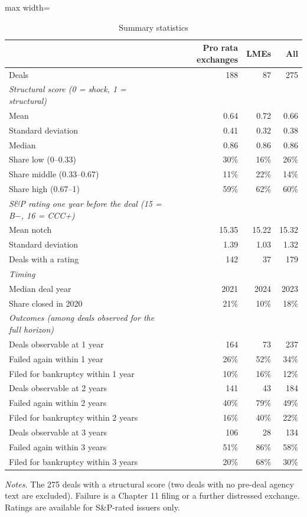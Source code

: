 \begin{table}[htbp]
\centering
\caption{Summary statistics}
\label{tab:sumstats}
\small
\begin{adjustbox}{max width=\textwidth}
\begin{tabular}{l r r r}
\toprule
 & Pro rata exchanges & LMEs & All \\
\midrule
Deals & 188 & 87 & 275 \\
\addlinespace \textit{Structural score (0 = shock, 1 = structural)} & & & \\
\quad Mean & 0.64 & 0.72 & 0.66 \\
\quad Standard deviation & 0.41 & 0.32 & 0.38 \\
\quad Median & 0.86 & 0.86 & 0.86 \\
\quad Share low (0--0.33) & 30\% & 16\% & 26\% \\
\quad Share middle (0.33--0.67) & 11\% & 22\% & 14\% \\
\quad Share high (0.67--1) & 59\% & 62\% & 60\% \\
\addlinespace \textit{S\&P rating one year before the deal (15 = B$-$, 16 = CCC+)} & & & \\
\quad Mean notch & 15.35 & 15.22 & 15.32 \\
\quad Standard deviation & 1.39 & 1.03 & 1.32 \\
\quad Deals with a rating & 142 & 37 & 179 \\
\addlinespace \textit{Timing} & & & \\
\quad Median deal year & 2021 & 2024 & 2023 \\
\quad Share closed in 2020 & 21\% & 10\% & 18\% \\
\addlinespace \textit{Outcomes (among deals observed for the full horizon)} & & & \\
\quad Deals observable at 1 year & 164 & 73 & 237 \\
\quad\quad Failed again within 1 year & 26\% & 52\% & 34\% \\
\quad\quad Filed for bankruptcy within 1 year & 10\% & 16\% & 12\% \\
\quad Deals observable at 2 years & 141 & 43 & 184 \\
\quad\quad Failed again within 2 years & 40\% & 79\% & 49\% \\
\quad\quad Filed for bankruptcy within 2 years & 16\% & 40\% & 22\% \\
\quad Deals observable at 3 years & 106 & 28 & 134 \\
\quad\quad Failed again within 3 years & 51\% & 86\% & 58\% \\
\quad\quad Filed for bankruptcy within 3 years & 20\% & 68\% & 30\% \\
\bottomrule
\end{tabular}
\end{adjustbox}
\begin{minipage}{0.9\textwidth}\vspace{4pt}\footnotesize
\textit{Notes.} The 275 deals with a structural score (two deals with no pre-deal agency text are excluded). Failure is a Chapter 11 filing or a further distressed exchange. Ratings are available for S\&P-rated issuers only.
\end{minipage}
\end{table}
